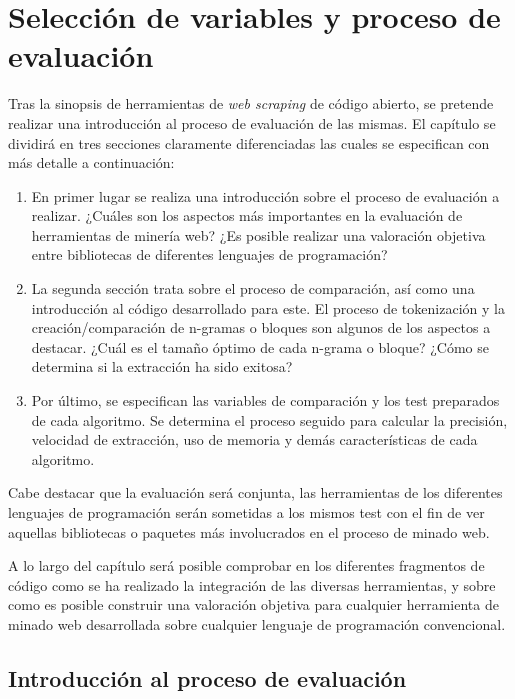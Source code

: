 
\chapter{Selección de variables y proceso de evaluación}
\label{cha:seleccion de variables y proceso de evaluacion}

Tras la sinopsis de herramientas de \emph{web scraping} de código abierto, se pretende realizar una 
introducción al proceso de evaluación de las mismas. El capítulo se dividirá en tres secciones claramente 
diferenciadas las cuales se especifican con más detalle a continuación:

\begin{enumerate}
  \item En primer lugar se realiza una introducción sobre el proceso de evaluación a realizar. ¿Cuáles
  son los aspectos más importantes en la evaluación de herramientas de minería web? ¿Es posible realizar 
  una valoración objetiva entre bibliotecas de diferentes lenguajes de programación?
  \item La segunda sección trata sobre el proceso de comparación, así como una introducción al código
  desarrollado para este. El proceso de tokenización y la creación/comparación de n-gramas o bloques son 
  algunos de los aspectos a destacar. ¿Cuál es el tamaño óptimo de cada n-grama o bloque? ¿Cómo se determina 
  si la extracción ha sido exitosa?
  \item Por último, se especifican las variables de comparación y los test preparados de cada algoritmo.
  Se determina el proceso seguido para calcular la precisión, velocidad de extracción, uso de memoria
  y demás características de cada algoritmo.
\end{enumerate}

Cabe destacar que la evaluación será conjunta, las herramientas de los diferentes lenguajes de programación 
serán sometidas a los mismos test con el fin de ver aquellas bibliotecas o paquetes más involucrados en el 
proceso de minado web. 

A lo largo del capítulo será posible comprobar en los diferentes fragmentos de código como se ha realizado
la integración de las diversas herramientas, y sobre como es posible construir una valoración objetiva para
cualquier herramienta de minado web desarrollada sobre cualquier lenguaje de programación convencional.

\section{Introducción al proceso de evaluación}
\label{sec:introduccion al proceso de evaluacion}


